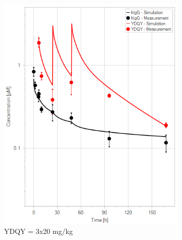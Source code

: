\documentclass[fleqn,10pt]{physiome}
\begin{document}
\begin{figure}[htb]
\begin{subfigure}{0.32\textwidth}
        \includegraphics[width=\textwidth]{pl14.png}
        \caption{YDQY = 3x20 mg/kg}
        \label{fig:7d}
    \end{subfigure}
    \hfill
    \begin{subfigure}{0.32\textwidth}

\end{subfigure}
\end{figure}
\end{document}
